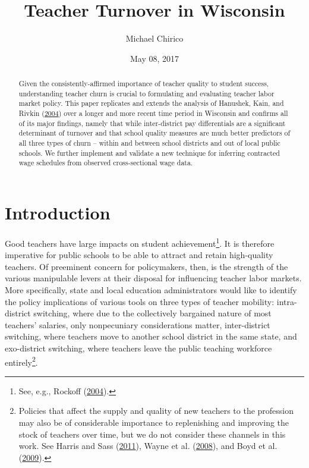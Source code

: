 \documentclass[12pt,]{article}
\title{Teacher Turnover in Wisconsin}
\author{Michael Chirico}
\date{May 08, 2017}
\let\rmarkdownfootnote\footnote%
\def\footnote{\protect\rmarkdownfootnote}
\newcommand{\TAG}[1]{}
\begin{document}
\maketitle
\begin{abstract}
Given the consistently-affirmed importance of teacher quality to student
success, understanding teacher churn is crucial to formulating and
evaluating teacher labor market policy. This paper replicates and
extends the analysis of Hanushek, Kain, and Rivkin
(\protect\hyperlink{ref-hanushek}{2004}) over a longer and more recent
time period in Wisconsin and confirms all of its major findings, namely
that while inter-district pay differentials are a significant
determinant of turnover and that school quality measures are much better
predictors of all three types of churn -- within and between school
districts and out of local public schools. We further implement and
validate a new technique for inferring contracted wage schedules from
observed cross-sectional wage data.
\end{abstract}

\section{Introduction}\label{introduction}

\TAG{BEGIN_INTRO}

Good teachers have large impacts on student achievement\footnote{See,
  e.g., Rockoff (\protect\hyperlink{ref-rockoff}{2004}).}. It is
therefore imperative for public schools to be able to attract and retain
high-quality teachers. Of preeminent concern for policymakers, then, is
the strength of the various manipulable levers at their disposal for
influencing teacher labor markets. More specifically, state and local
education administrators would like to identify the policy implications
of various tools on three types of teacher mobility: intra-district
switching, where due to the collectively bargained nature of most
teachers' salaries, only nonpecuniary considerations matter,
inter-district switching, where teachers move to another school district
in the same state, and exo-district switching, where teachers leave the
public teaching workforce entirely\footnote{Policies that affect the
  supply and quality of new teachers to the profession may also be of
  considerable importance to replenishing and improving the stock of
  teachers over time, but we do not consider these channels in this
  work. See Harris and Sass (\protect\hyperlink{ref-harris}{2011}),
  Wayne et al. (\protect\hyperlink{ref-wayne}{2008}), and Boyd et al.
  (\protect\hyperlink{ref-boyd2009}{2009}).}.
\end{document}
